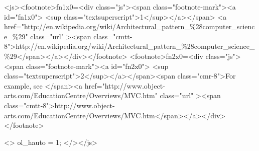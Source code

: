 \def\jstoday{2009-03-31 17:46:00}   <js><footnote>fn1x0=<div class="js"><span class="footnote-mark"><a 
 id="fn1x0">   <sup class="textsuperscript">1</sup></a></span>  <a 
href="http://en.wikipedia.org/wiki/Architectural_pattern_\%28computer_science_\%29" class="url" ><span 
class="cmtt-8">http://en.wikipedia.org/wiki/Architectural_pattern_\%28computer_science_\%29</span></a></div></footnote> 
<footnote>fn2x0=<div class="js"><span class="footnote-mark"><a 
 id="fn2x0">   <sup class="textsuperscript">2</sup></a></span><span 
class="cmr-8">For example, see   </span><a 
href="http://www.object-arts.com/EducationCentre/Overviews/MVC.htm" class="url" ><span 
class="cmtt-8">http://www.object-arts.com/EducationCentre/Overviews/MVC.htm</span></a></div></footnote> 

   <>    ol_hauto = 1;                                                                                                   </></js>